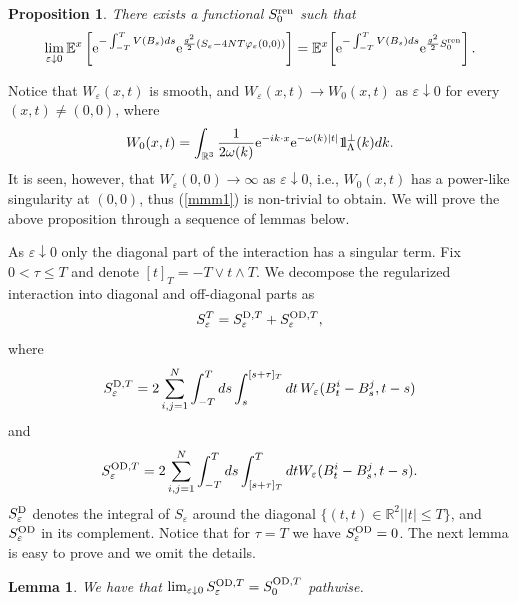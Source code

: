 \documentclass[12pt]{article}
\newtheorem{lemma}[theorem]{Lemma}
\newtheorem{proposition}[theorem]{Proposition}
\newcommand{\bl}[1]{\begin{lemma}\label{#1}}
\newcommand{\el}{\end{lemma}}
\def\bbbone{{\mathchoice {\rm 1\mskip-4mu l} {\rm 1\mskip-4mu l}
{\rm 1\mskip-4.5mu l} {\rm 1\mskip-5mu l}}}
\def\one{\bbbone}
\newcommand{\kp}{\one_\Lambda^\perp(k)}
\newcommand{\Ebb}{{\mathbb E}}
\providecommand{\eq}[1]{\begin{equation}\label{#1}}
\providecommand{\en}{\end{equation}}
\providecommand{\BR}{{\mathbb{R}^3 }}
\providecommand{\iijj}{\sum_{i,j=1}^N}
\providecommand{\od}{{\rm OD}}
\providecommand{\dd}{{\rm D}}
\providecommand{\RR}{\mathbb{R}}
\providecommand{\kak}[1]{(\ref{#1})}
\providecommand{\e}{{\rm e}}
\providecommand{\1}{\mathbb{1}}
\providecommand{\dd}{\mathop{\mathrm{d}}\nolimits}
\providecommand{\eps}{\varepsilon}
\providecommand{\ren}{{\rm ren}}
\begin{document}
\begin{proposition}
There exists a functional $S_0^\ren $ such that
\eq{mmm1}
\lim_{\eps\downarrow 0}\Ebb^x \left[\e^{-\int_{-T}^TV(B_s)ds} \e^{\frac{g^2}{2}( S_\eps-4NT\varphi_\eps(0,0))}\right] =
\Ebb^x\!\left[\e^{-\int_{-T}^TV(B_s)ds} \e^{\frac{g^2}{2}S_0^\ren }\right].
\en
\end{proposition}
\noindent
Notice that $W_\eps (x,t)$ is smooth, and
$W_\eps (x,t)\to  W_0(x,t)$ as $\eps\downarrow0$ for every
$(x,t)\neq (0,0)$, where
\eq{tooi}
W_0(x,t)=\int_{\BR}\frac{1}{2\omega(k)}\e^{-ik\cdot x} \e^{-\omega(k)|t|} \kp dk.
\en
It is seen, however, that $W_\eps (0,0)\to \infty$ as $\eps\downarrow 0$, i.e., $W_0(x,t)$ has a power-like
singularity at $(0,0)$, thus \kak{mmm1} is non-trivial to obtain. We will prove the above proposition
through a sequence of lemmas below.

 As $\eps\downarrow 0$ only the diagonal part of the interaction has a singular term.
Fix $0<\tau\leq T$ and denote $[t]_T = -T\vee t \wedge T$. We decompose the regularized interaction
into diagonal and off-diagonal parts as
\eq{hiror6}
S_\eps^T = S_\eps^{\dd,T } + S_\eps^{\od,T },
\en
where
\eq{eniwa1}
S_\eps^{\dd,T } = 2\iijj \int_{-T}^T ds \int_{s}^{[s+\tau]_T} dt\, W_\eps (B_t^i-B_s^j,t-s)
\en
and
\eq{eniwa2}
S_\eps^{\od,T }  = 2\iijj \int_{-T}^T ds \int_{[s+\tau]_T}^{T}dt W_\eps (B_t^i-B_s^j,t-s).
\en
$S_\eps^{\dd }$ denotes the integral of $S_\eps$ around the diagonal $\{(t,t)\in\RR^2| |t|\leq T\}$, 
and $S_\eps^{\od } $ in its complement. Notice that for $\tau=T$ we have $S_\eps^{\od }=0$. The next 
lemma is easy to prove and we omit the details.
\bl{h1}
We have  that $\lim_{\eps\downarrow 0}S_\eps^{\od,T }  = S_0^{\od,T }$ pathwise.
\el
\end{document}
